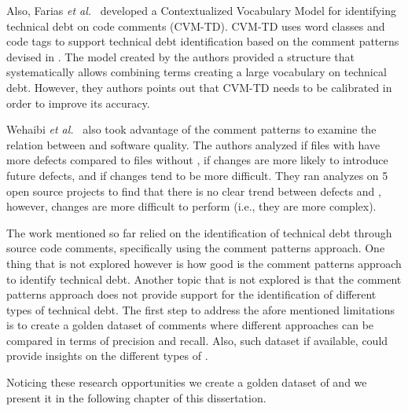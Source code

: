 Also, Farias \textit{et al.}~\cite{Farias2015MTD} developed a Contextualized Vocabulary Model for identifying technical debt on code comments (CVM-TD). CVM-TD uses word classes and code tags to support technical debt identification based on the comment patterns devised in \cite{Potdar2014ICSME}. The model created by the authors provided a structure that systematically allows combining terms creating a large vocabulary on technical debt. However, they authors points out that  CVM-TD needs to be calibrated in order to improve its accuracy. 

Wehaibi \textit{et al.}~\cite{wehaibi2016SANER} also took advantage of the comment patterns to examine the relation between \SATD and software quality. The authors analyzed if files with \SATD have more defects compared to files without \SATD, if \SATD changes are more likely to introduce future defects, and if \SATD changes tend to be more difficult. They ran analyzes on 5 open source projects to find that there is no clear trend between defects and \SATD, however, \SATD changes are more difficult to perform (i.e., they are more complex).

The work mentioned so far relied on the identification of technical debt through source code comments, specifically using the comment patterns approach. One thing that is not explored however is how good is the comment patterns approach to identify technical debt. Another topic that is not explored is that the comment patterns approach does not provide support for the identification of different types of technical debt. The first step to address the afore mentioned limitations is to create a golden dataset of \SATD comments where different approaches can be compared in terms of precision and recall. Also, such dataset if available, could provide insights on the different types of \SATD. 

Noticing these research opportunities we create a golden dataset of \SATD and we present it in the following chapter of this dissertation.